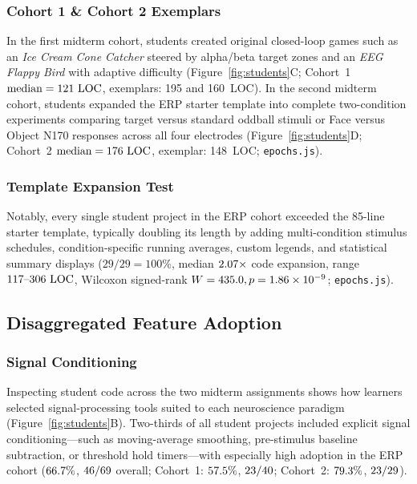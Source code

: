 \documentclass[11pt]{article}
\begin{document}
\subsubsection{Cohort 1 \& Cohort 2 Exemplars}
In the first midterm cohort, students created original closed-loop games such as an \emph{Ice Cream Cone Catcher} steered by alpha/beta target zones and an \emph{EEG Flappy Bird} with adaptive difficulty (Figure~\ref{fig:students}C; Cohort~1 $\text{median} = 121\text{ LOC}$, exemplars: 195 and 160~LOC). In the second midterm cohort, students expanded the ERP starter template into complete two-condition experiments comparing target versus standard oddball stimuli or Face versus Object N170 responses across all four electrodes (Figure~\ref{fig:students}D; Cohort~2 $\text{median} = 176\text{ LOC}$, exemplar: 148~LOC; \texttt{epochs.js}).

\subsubsection{Template Expansion Test}
Notably, every single student project in the ERP cohort exceeded the 85-line starter template, typically doubling its length by adding multi-condition stimulus schedules, condition-specific running averages, custom legends, and statistical summary displays ($29/29 = 100\%$, median $2.07\times$ code expansion, range $117\text{--}306\text{ LOC}$, Wilcoxon signed-rank $W = 435.0, p = 1.86 \times 10^{-9}$; \texttt{epochs.js}).

\subsection{Disaggregated Feature Adoption}

\subsubsection{Signal Conditioning}
Inspecting student code across the two midterm assignments shows how learners selected signal-processing tools suited to each neuroscience paradigm (Figure~\ref{fig:students}B). Two-thirds of all student projects included explicit signal conditioning---such as moving-average smoothing, pre-stimulus baseline subtraction, or threshold hold timers---with especially high adoption in the ERP cohort ($66.7\%$, $46/69$ overall; Cohort~1: $57.5\%$, $23/40$; Cohort~2: $79.3\%$, $23/29$).
\end{document}
